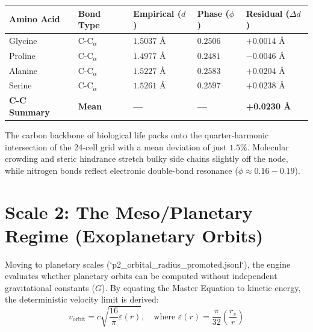 \documentclass[11pt, letterpaper, openany]{book}
\begin{document}
\vspace{0.3cm}
\begin{center}
\renewcommand{\arraystretch}{1.2}
\small
\begin{tabular}{|p{3.0cm}|p{2.2cm}|p{2.5cm}|p{2.2cm}|p{2.5cm}|}
\hline
\rowcolor{kishblue!12}
\textbf{Amino Acid} & \textbf{Bond Type} & \textbf{Empirical ($d$)} & \textbf{Phase ($\phi$)} & \textbf{Residual ($\Delta d$)} \\
\hline
Glycine & C-C$_\alpha$ & $1.5037$ \AA & $0.2506$ & $\mathbf{+0.0014}$ \AA \\
\hline
Proline & C-C$_\alpha$ & $1.4977$ \AA & $0.2481$ & $\mathbf{-0.0046}$ \AA \\
\hline
Alanine & C-C$_\alpha$ & $1.5227$ \AA & $0.2583$ & $+0.0204$ \AA \\
\hline
Serine & C-C$_\alpha$ & $1.5261$ \AA & $0.2597$ & $+0.0238$ \AA \\
\hline
\rowcolor{goldseal!15}
\textbf{C-C Summary} & \textbf{Mean} & \textbf{---} & \textbf{---} & \textbf{+0.0230 \AA} \\
\hline
\end{tabular}
\end{center}
\vspace{0.3cm}

The carbon backbone of biological life packs onto the quarter-harmonic intersection of the 24-cell grid with a mean deviation of just $1.5\%$. Molecular crowding and steric hindrance stretch bulky side chains slightly off the node, while nitrogen bonds reflect electronic double-bond resonance ($\phi \approx 0.16 - 0.19$).

\section{Scale 2: The Meso/Planetary Regime (Exoplanetary Orbits)}

Moving to planetary scales (`p2_orbital_radius_promoted.jsonl`), the engine evaluates whether planetary orbits can be computed without independent gravitational constants ($G$). By equating the Master Equation to kinetic energy, the deterministic velocity limit is derived:
\[v_{\text{orbit}} = c \sqrt{\frac{16}{\pi} \varepsilon(r)}, \quad \text{where } \varepsilon(r) = \frac{\pi}{32} \left(\frac{r_s}{r}\right)\]
\end{document}
